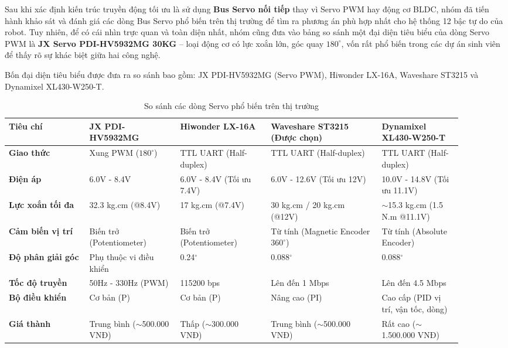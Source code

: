 Sau khi xác định kiến trúc truyền động tối ưu là sử dụng \textbf{Bus Servo nối tiếp} thay vì Servo PWM hay động cơ BLDC, nhóm đã tiến hành khảo sát và đánh giá các dòng Bus Servo phổ biến trên thị trường để tìm ra phương án phù hợp nhất cho hệ thống 12 bậc tự do của robot. Tuy nhiên, để có cái nhìn trực quan và toàn diện nhất, nhóm cũng đưa vào bảng so sánh một đại diện tiêu biểu của dòng Servo PWM là \textbf{JX Servo PDI-HV5932MG 30KG} -- loại động cơ có lực xoắn lớn, góc quay $180^{\circ}$, vốn rất phổ biến trong các dự án sinh viên để thấy rõ sự khác biệt giữa hai công nghệ.

Bốn đại diện tiêu biểu được đưa ra so sánh bao gồm: JX PDI-HV5932MG (Servo PWM), Hiwonder LX-16A, Waveshare ST3215 và Dynamixel XL430-W250-T.

\begin{table}[H]
\centering
\caption{So sánh các dòng Servo phổ biến trên thị trường}
\label{tab:bus_servo_comparison}
\renewcommand{\arraystretch}{1.3}
\begin{tabular}{|p{0.16\linewidth}|p{0.18\linewidth}|p{0.18\linewidth}|p{0.22\linewidth}|p{0.16\linewidth}|}
\hline
\textbf{Tiêu chí} & \textbf{JX PDI-HV5932MG} & \textbf{Hiwonder LX-16A} & \textbf{Waveshare ST3215 (Được chọn)} & \textbf{Dynamixel XL430-W250-T} \\ \hline
\textbf{Giao thức} & Xung PWM ($180^{\circ}$) & TTL UART (Half-duplex) & TTL UART (Half-duplex) & TTL UART (Half-duplex) \\ \hline
\textbf{Điện áp} & 6.0V - 8.4V & 6.0V - 8.4V (Tối ưu 7.4V) & 6.0V - 12.6V (Tối ưu 12V) & 10.0V - 14.8V (Tối ưu 11.1V) \\ \hline
\textbf{Lực xoắn tối đa} & 32.3 kg.cm (@8.4V) & 17 kg.cm (@7.4V) & 30 kg.cm / 20 kg.cm (@12V) & $\sim$15.3 kg.cm (1.5 N.m @11.1V) \\ \hline
\textbf{Cảm biến vị trí} & Biến trở (Potentiometer) & Biến trở (Potentiometer) & Từ tính (Magnetic Encoder $360^{\circ}$) & Từ tính (Absolute Encoder) \\ \hline
\textbf{Độ phân giải góc} & Phụ thuộc vi điều khiển & 0.24$^{\circ}$ & 0.088$^{\circ}$ & 0.088$^{\circ}$ \\ \hline
\textbf{Tốc độ truyền} & 50Hz - 330Hz (PWM) & 115200 bps & Lên đến 1 Mbps & Lên đến 4.5 Mbps \\ \hline
\textbf{Bộ điều khiển} & Cơ bản (P) & Cơ bản (P) & Nâng cao (PI) & Cao cấp (PID vị trí, vận tốc, dòng) \\ \hline
\textbf{Giá thành} & Trung bình ($\sim$500.000 VNĐ) & Thấp ($\sim$300.000 VNĐ) & Trung bình ($\sim$500.000 VNĐ) & Rất cao ($\sim$1.500.000 VNĐ) \\ \hline
\end{tabular}
\end{table}

